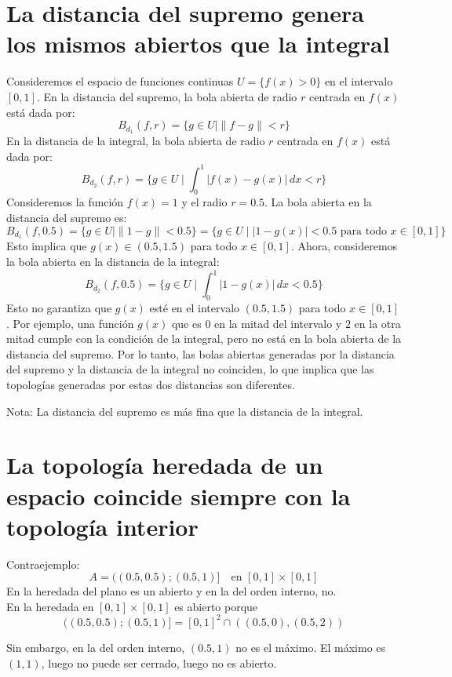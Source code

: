 \documentclass[12pt]{article}
\begin{document}
\section*{La distancia del supremo genera los mismos abiertos que la integral}
Consideremos el espacio de funciones continuas \(U=\{f(x)>0\}\) en el intervalo \([0,1]\). En la distancia del supremo, la bola abierta de radio \(r\) centrada en \(f(x)\) está dada por:
\[ B_{d_1}(f, r) = \{ g \in U \mid \|f - g\| < r \} \]
En la distancia de la integral, la bola abierta de radio \(r\) centrada en \(f(x)\) está dada por:
\[ B_{d_2}(f, r) = \{ g \in U \mid \int_0^1 |f(x) - g(x)| \, dx < r \} \]
Consideremos la función \(f(x) = 1\) y el radio \(r = 0.5\). La bola abierta en la distancia del supremo es:
\[ B_{d_1}(f, 0.5) = \{ g \in U \mid \|1 - g\| < 0.5 \} = \{ g \in U \mid |1 - g(x)| < 0.5 \text{ para todo } x \in [0,1] \} \]
Esto implica que \( g(x) \in (0.5, 1.5) \) para todo \( x \in [0,1] \).
Ahora, consideremos la bola abierta en la distancia de la integral:
\[ B_{d_2}(f, 0.5) = \{ g \in U \mid \int_0^1 |1 - g(x)| \, dx < 0.5 \} \]
Esto no garantiza que \( g(x) \) esté en el intervalo \( (0.5, 1.5) \) para todo \( x \in [0,1] \). Por ejemplo, una función \( g(x) \) que es \( 0 \) en la mitad del intervalo y \( 2 \) en la otra mitad cumple con la condición de la integral, pero no está en la bola abierta de la distancia del supremo.
Por lo tanto, las bolas abiertas generadas por la distancia del supremo y la distancia de la integral no coinciden, lo que implica que las topologías generadas por estas dos distancias son diferentes.

Nota: La distancia del supremo es más fina que la distancia de la integral.
\section*{La topología heredada de un espacio coincide siempre con la topología interior}
Contraejemplo: 
\[
A = ((0.5, 0.5); (0.5, 1)] \quad \text{en } [0,1] \times [0,1]
\]
En la heredada del plano es un abierto y en la del orden interno, no. \\

En la heredada en \([0,1] \times [0,1]\) es abierto porque 
\[
((0.5, 0.5); (0.5, 1)] = [0,1]^2 \cap ((0.5, 0), (0.5, 2))
\]

Sin embargo, en la del orden interno, \((0.5, 1)\) no es el máximo. 
El máximo es \((1,1)\), luego no puede ser cerrado, luego no es abierto. \\
\end{document}
